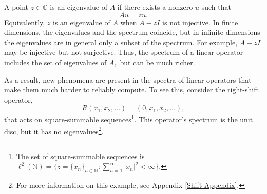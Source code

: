 A point $z \in \mathbb{C}$ is an eigenvalue of $A$ if there exists a nonzero $u$ such that
\begin{equation}
Au=z u.
\end{equation} 
Equivalently, $z$ is an eigenvalue of $A$ when $A-z I$ is not injective. In finite dimensions, the eigenvalues and the spectrum coincide, but in infinite dimensions the eigenvalues are in general only a subset of the spectrum. For example, $A-zI$ may be injective but not surjective. Thus, the
spectrum of a linear operator includes the set of eigenvalues of $A,$ but can be much richer. 


As a result, new phenomena are present in the spectra of linear operators that make them much harder to reliably compute. To see this, consider the right-shift operator, 
\begin{equation}\label{right shift}
R(x_1, x_2, \dots) = (0, x_1, x_2, \dots),
\end{equation}
that acts on square-summable sequences\footnote{The set of square-summable sequences is
    $\ell^2(\mathbb{N}) = \{z = \{x_n\}_{n \in \mathbb{N}}: \sum_{n=1}^{\infty} |x_n|^2 < \infty\}.$}. This operator's spectrum is the unit disc, but it has no eigenvalues\footnote{For more information on this example, see Appendix \ref{Shift Appendix}.}.

